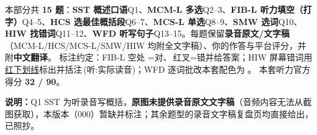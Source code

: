 
\vspace{1mm}
{\small\color{gray} 本部分共 \textbf{15 题}：\textbf{SST 概述口语}Q1、\textbf{MCM-L 多选}Q2--3、\textbf{FIB-L 听力填空（打字）}Q4--5、\textbf{HCS 选最佳概括段}Q6--7、\textbf{MCS-L 单选}Q8--9、\textbf{SMW 选词}Q10、\textbf{HIW 找错词}Q11--12、\textbf{WFD 听写句子}Q13--15。每题保留\textbf{录音原文/文字稿}（MCM-L/HCS/MCS-L/SMW/HIW 均附全文字稿）、你的作答与平台评分，并附\textbf{中文翻译}。
标注约定：FIB-L 空处 =对、{\color{cWrong}}\,红叉=错并给答案；HIW 屏幕错词用{\color{cWrong}\uline{红下划线}}标出并括注\,{\footnotesize\color{cFix}(听:实际读音)}；WFD 逐词批改本套配色为 \wfdlegend 。
本套听力官方得分 \textbf{32 / 90}。}
\vspace{1mm}

{\small\color{gray}\textbf{说明：}Q1 SST 为听录音写概括，\textbf{原图未提供录音原文文字稿}（音频内容无法从截图获取），本版本（000）暂缺并标注；其余题型的录音文字稿复盘页均直接给出，已照抄。}
\vspace{2mm}


